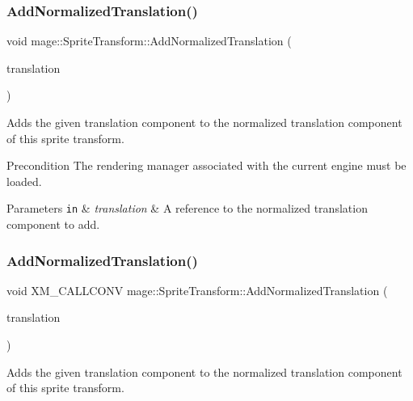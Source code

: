 \subsubsection{\texorpdfstring{Add\+Normalized\+Translation()}{AddNormalizedTranslation()}\hspace{0.1cm}{\footnotesize\ttfamily [2/3]}}
{\footnotesize\ttfamily void mage\+::\+Sprite\+Transform\+::\+Add\+Normalized\+Translation (\begin{DoxyParamCaption}\item[{const X\+M\+F\+L\+O\+A\+T2 \&}]{translation }\end{DoxyParamCaption})}

Adds the given translation component to the normalized translation component of this sprite transform.

\begin{DoxyPrecond}{Precondition}
The rendering manager associated with the current engine must be loaded. 
\end{DoxyPrecond}

\begin{DoxyParams}[1]{Parameters}
\mbox{\tt in}  & {\em translation} & A reference to the normalized translation component to add. \\
\hline
\end{DoxyParams}
\hypertarget{structmage_1_1_sprite_transform_a167f79e773eeb4dca46915f748726113}{}\label{structmage_1_1_sprite_transform_a167f79e773eeb4dca46915f748726113} 
\subsubsection{\texorpdfstring{Add\+Normalized\+Translation()}{AddNormalizedTranslation()}\hspace{0.1cm}{\footnotesize\ttfamily [3/3]}}
{\footnotesize\ttfamily void X\+M\+\_\+\+C\+A\+L\+L\+C\+O\+NV mage\+::\+Sprite\+Transform\+::\+Add\+Normalized\+Translation (\begin{DoxyParamCaption}\item[{F\+X\+M\+V\+E\+C\+T\+OR}]{translation }\end{DoxyParamCaption})}

Adds the given translation component to the normalized translation component of this sprite transform.

